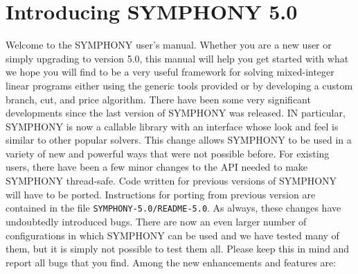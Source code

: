 \section{Introducing SYMPHONY 5.0}
\label{whats-new}

Welcome to the SYMPHONY user's manual. Whether you are a new user or simply
upgrading to version 5.0, this manual will help you get started with what we
hope you will find to be a very useful framework for solving mixed-integer
linear programs either using the generic tools provided or by developing a
custom branch, cut, and price algorithm. There have been some very significant
developments since the last version of SYMPHONY was released. IN particular,
SYMPHONY is now a callable library with an interface whose look and feel is
similar to other popular solvers. This change allows SYMPHONY to be used in a
variety of new and powerful ways that were not possible before. For existing
users, there have been a few minor changes to the API needed to make SYMPHONY
thread-safe. Code written for previous versions of SYMPHONY will have to be
ported. Instructions for porting from previous version are contained in the
file \texttt{SYMPHONY-5.0/README-5.0}. As always, these changes have
undoubtedly introduced bugs. There are now an even larger number of
configurations in which SYMPHONY can be used and we have tested many of them,
but it is simply not possible to test them all. Please keep this in mind and
report all bugs that you find. Among the new enhancements and features are:


